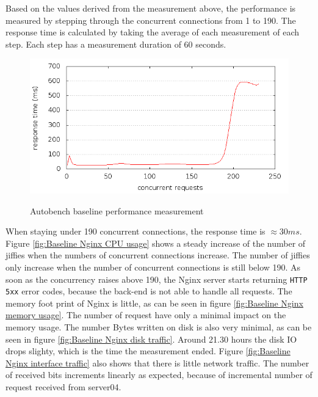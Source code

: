 \documentclass[Measurements]{subfiles}
\begin{document}
Based on the values derived from the measurement above, the performance is measured by stepping through the concurrent connections from 1 to 190. The response time is calculated by taking the average of each measurement of  each step. Each step has a measurement duration of 60 seconds. 

\begin{figure}[H]
\caption{Autobench baseline performance measurement}
\centering
\includegraphics[scale=0.55] {images/results/baseline/output.png}
\label{fig:Baseline performance measurement}
\end{figure}

When staying under 190 concurrent connections, the response time is \mbox{$\approx 30 ms$}. Figure \ref{fig:Baseline Nginx CPU usage} shows a steady increase of the number of jiffies when the numbers of concurrent connections increase. The number of jiffies only increase when the number of concurrent connections is still below 190. As soon as the concurrency raises above 190, the Nginx server starts returning \verb+HTTP 5xx+ error codes, because the back-end is not able to handle all requests. The memory foot print of Nginx is little, as can be seen in figure \ref{fig:Baseline Nginx memory usage}. The number of request have only a minimal impact on the memory usage. The number Bytes written on disk is also very minimal, as can be seen in figure \ref{fig:Baseline Nginx disk traffic}. Around 21.30 hours the disk IO drops slighty, which is the time the measurement ended. Figure \ref{fig:Baseline Nginx interface traffic} also shows that there is little network traffic. The number of received bits increments linearly as expected, because of incremental number of request received from server04.   
\end{document}

